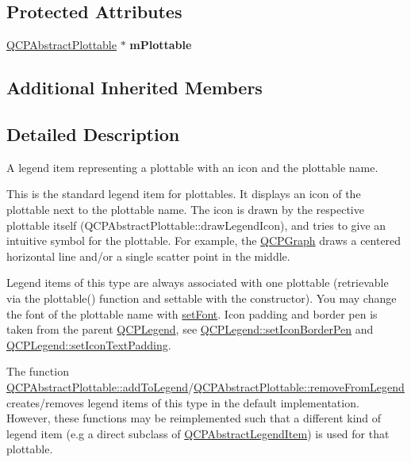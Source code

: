 \subsection*{Protected Attributes}
\begin{DoxyCompactItemize}
\item 
\hyperlink{class_q_c_p_abstract_plottable}{Q\+C\+P\+Abstract\+Plottable} $\ast$ {\bfseries m\+Plottable}\hypertarget{class_q_c_p_plottable_legend_item_a7d31edb28c3a1eb9037b9987c7615872}{}\label{class_q_c_p_plottable_legend_item_a7d31edb28c3a1eb9037b9987c7615872}

\end{DoxyCompactItemize}
\subsection*{Additional Inherited Members}


\subsection{Detailed Description}
A legend item representing a plottable with an icon and the plottable name. 

This is the standard legend item for plottables. It displays an icon of the plottable next to the plottable name. The icon is drawn by the respective plottable itself (Q\+C\+P\+Abstract\+Plottable\+::draw\+Legend\+Icon), and tries to give an intuitive symbol for the plottable. For example, the \hyperlink{class_q_c_p_graph}{Q\+C\+P\+Graph} draws a centered horizontal line and/or a single scatter point in the middle.

Legend items of this type are always associated with one plottable (retrievable via the plottable() function and settable with the constructor). You may change the font of the plottable name with \hyperlink{class_q_c_p_abstract_legend_item_a409c53455d8112f71d70c0c43eb10265}{set\+Font}. Icon padding and border pen is taken from the parent \hyperlink{class_q_c_p_legend}{Q\+C\+P\+Legend}, see \hyperlink{class_q_c_p_legend_a2f2c93d18a651f4ff294bb3f026f49b8}{Q\+C\+P\+Legend\+::set\+Icon\+Border\+Pen} and \hyperlink{class_q_c_p_legend_a62973bd69d5155e8ea3141366e8968f6}{Q\+C\+P\+Legend\+::set\+Icon\+Text\+Padding}.

The function \hyperlink{class_q_c_p_abstract_plottable_aa64e93cb5b606d8110d2cc0a349bb30f}{Q\+C\+P\+Abstract\+Plottable\+::add\+To\+Legend}/\hyperlink{class_q_c_p_abstract_plottable_a26d936d11852ea08e6bc0edae3a514a2}{Q\+C\+P\+Abstract\+Plottable\+::remove\+From\+Legend} creates/removes legend items of this type in the default implementation. However, these functions may be reimplemented such that a different kind of legend item (e.\+g a direct subclass of \hyperlink{class_q_c_p_abstract_legend_item}{Q\+C\+P\+Abstract\+Legend\+Item}) is used for that plottable.

